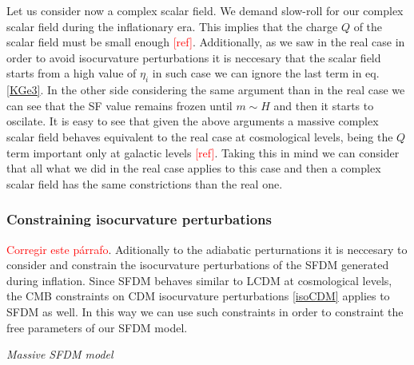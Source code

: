 \documentclass[amssymb,twocolumn,prd,nofootinbib,showpacs]{revtex4-1}
\begin{document}
Let us consider now a complex scalar field. %
We demand slow-roll for our complex scalar field during the inflationary era. This implies that the charge $Q$ of the scalar field must be small enough \textcolor{red}{[ref]}. Additionally, as we saw in the real case in order to avoid isocurvature perturbations it is neccesary that the scalar field starts from a high value of $\eta_i$ in such case we can ignore the last term in eq. \eqref{KGe3}. In the other side considering the same argument than in the real case we can see that the SF value remains frozen until $m\sim H$ and then it starts to oscilate. It is easy to see that given the above arguments a massive complex scalar field behaves equivalent to the real case at cosmological levels, being the $Q $ term important only at galactic levels \textcolor{red}{[ref]}. Taking this in mind we can consider that all what we did in the real case applies to this case and then a complex scalar field has the same constrictions than the real one. 


\subsubsection{Constraining isocurvature perturbations}

\textcolor{red}{Corregir este p\'arrafo}. Aditionally to the adiabatic perturnations it is neccesary to consider and constrain the isocurvature perturbations of the SFDM generated during inflation. 
Since SFDM behaves similar to LCDM at cosmological levels, the CMB constraints on CDM isocurvature perturbations \eqref{isoCDM} applies to SFDM as well. In this way we can use such constraints in order to constraint the free parameters of our SFDM model.
\begin{center}
\textit{Massive SFDM model}
\end{center}
\end{document}
